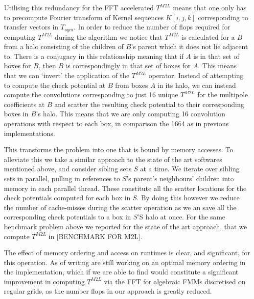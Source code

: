 Utilising this redundancy for the FFT accelerated $T^{M2L}$ means that one only has to precompute Fourier transform of Kernel sequences $K[i, j, k]$ corresponding to transfer vectors in $T_{\textit{sym}}$. In order to reduce the number of flops required for computing $T^{M2L}$ during the algorithm we notice that $T^{M2L}$ is calculated for a $B$ from a halo consisting of the children of $B$'s parent which it does not lie adjacent to. There is a conjugacy in this relationship meaning that if $A$ is in that set of boxes for $B$, then $B$ is correspondingly in that set of boxes for $A$. This means that we can `invert' the application of the $T^{M2L}$ operator. Instead of attempting to compute the check potential at $B$ from boxes $A$ in its halo, we can instead compute the convolutions corresponding to just 16 unique $T^{M2L}$ for the multipole coefficients at $B$ and scatter the resulting check potential to their corresponding boxes in $B$'s halo. This means that we are only computing 16 convolution operations with respect to each box, in comparison the 1664 as in previous implementations.

This transforms the problem into one that is bound by memory accesses. To alleviate this we take a similar approach to the state of the art softwares mentioned above, and consider sibling sets $S$ at a time. We iterate over sibling sets in parallel, pulling in references to $S$'s parent's neighbours' children into memory in each parallel thread. These constitute all the scatter locations for the check potentials computed for each box in $S$. By doing this however we reduce the number of cache-misses during the scatter operation as we an save all the corresponding check potentials to a box in $S$'S halo at once. For the same benchmark problem above we reported for the state of the art approach, that we compute $T^{M2L}$ in [BENCHMARK FOR M2L].

The effect of memory ordering and access on runtimes is clear, and significant, for this operation. As of writing are still working on an optimal memory ordering in the implementation, which if we are able to find would constitute a significant improvement in computing $T^{M2L}$ via the FFT for algebraic FMMs discretised on regular grids, as the number flops in our approach is greatly reduced.
